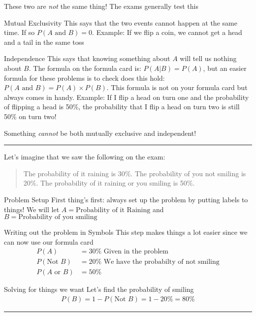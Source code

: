 \documentclass[landscape]{article}
\newcommand{\myline}{\vspace{4pt}\hrule  \vspace{4pt}}
\newenvironment{topic}[1]{
	\noindent \textbf{\textsc{\color{harvardcrimson}{#1}}}
	\noindent \hspace{-3.5pt}
}{
	\myline
}
\newenvironment{compactdesc}{
	\begin{description}[leftmargin=1em,labelsep=0.7em, font=\normalfont\itshape]
	}{
	\end{description}
}
\begin{document}
\begin{multicols*}{3}
	\begin{topic}{Mutual Exclusivity and Independence}
		These two are \textit{not} the same thing! The exams generally test this
		\begin{compactdesc}
			\item[Mutual Exclusivity] This says that the two events cannot happen at the same time. If so $ P(A \text{ and } B) = 0 $. Example: If we flip a coin, we cannot get a head and a tail in the same toss 
			\item[Independence] This says that knowing something about $ A $ will tell us nothing about $ B $. The formula on the formula card is: $ P(A | B) = P(A) $, but an easier formula for these problems is to check does this hold: $ P(A \text{ and }  B) = P(A) \times P(B) $. This formula is not on your formula card but always comes in handy. Example: If I flip a head on turn one and the probability of flipping a head is 50\%, the probability that I flip a head on turn two is still 50\% on turn two!
		\end{compactdesc}
		Something \textit{cannot} be both mutually exclusive and independent! 
	\end{topic} 	
	\begin{topic}{Probability Example}
		Let's imagine that we saw the following on the exam: 
		\begin{quote}
			The probability of it raining is 30\%. The probability of you not smiling is 20\%. The probability of it raining or you smiling is 50\%.
		\end{quote}
		\begin{compactdesc}
			\item[Problem Setup] First thing's first: always set up the problem by putting labels to things! We will let $ A = \text{Probability of it Raining} $ and $ B = \text{Probability of you smiling} $
			\item[Writing out the problem in Symbols] This step makes things a lot easier since we can now use our formula card
			\begin{align*}
			P(A) &= 30\% \text{ Given in the problem}\\
			P(\text{Not }B) &= 20\% \text{ We have the probabilty of not smiling}\\
			P(A \text{ or } B) &= 50\% 
			\end{align*} 
			\item[Solving for things we want] Let's find the probability of smiling
			\begin{align*}
			P(B) = 1 - P(\text{Not }B) = 1 - 20\% = 80\%

\end{align*}
\end{compactdesc}
\end{topic}
\end{multicols*}
\end{document}
